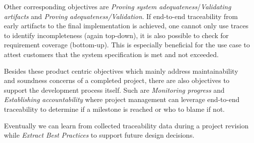 

Other corresponding objectives are \textit{Proving system adequateness}/\textit{Validating artifacts} and \textit{Proving adequateness/Validation}. 
If end-to-end traceability from early artifacts to the final implementation is achieved, one cannot only use traces to identify incompleteness (again top-down), it is also possible to check for requirement coverage (bottom-up).
This is especially beneficial for the use case to attest customers that the system specification is met and not exceeded.

Besides these product centric objectives which mainly address maintainability and soundness concerns of a completed project, there are also objectives to support the development process itself.
Such are \textit{Monitoring progress} and \textit{Establishing accountability} where project management can leverage end-to-end traceability to determine if a milestone is reached or who to blame if not. 

Eventually we can learn from collected traceability data during a project revision while \textit{Extract Best Practices} to support future design decisions. 



